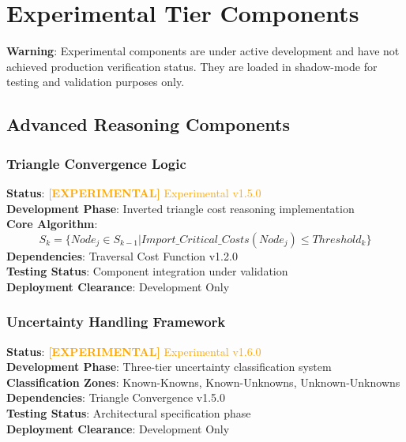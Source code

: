\documentclass[11pt,letterpaper]{article}
\newcommand{\experimentalcomponent}[1]{\textcolor{orange}{\textbf{[EXPERIMENTAL]} #1}}
\begin{document}
\section{Experimental Tier Components}
\label{sec:experimental}

\textbf{Warning}: Experimental components are under active development and have not achieved production verification status. They are loaded in shadow-mode for testing and validation purposes only.

\subsection{Advanced Reasoning Components}

% 
% 
% 

\subsubsection{Triangle Convergence Logic}
\textbf{Status}: \experimentalcomponent{Experimental v1.5.0} \\
\textbf{Development Phase}: Inverted triangle cost reasoning implementation \\
\textbf{Core Algorithm}:
\begin{equation}
S_k = \{Node_j \in S_{k-1} | Import\_Critical\_Costs(Node_j) \leq Threshold_k\}
\end{equation}
\textbf{Dependencies}: Traversal Cost Function v1.2.0 \\
\textbf{Testing Status}: Component integration under validation \\
\textbf{Deployment Clearance}: Development Only

\subsubsection{Uncertainty Handling Framework}
\textbf{Status}: \experimentalcomponent{Experimental v1.6.0} \\
\textbf{Development Phase}: Three-tier uncertainty classification system \\
\textbf{Classification Zones}: Known-Knowns, Known-Unknowns, Unknown-Unknowns \\
\textbf{Dependencies}: Triangle Convergence v1.5.0 \\
\textbf{Testing Status}: Architectural specification phase \\
\textbf{Deployment Clearance}: Development Only
\end{document}
